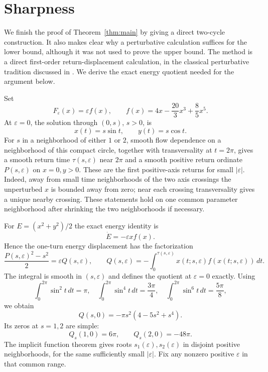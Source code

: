 \section{Sharpness}\label{sec:sharpness}

We finish the proof of Theorem~\ref{thm:main} by giving a direct
two-cycle construction. It also makes clear why a perturbative
calculation suffices for the lower bound, although it was not
used to prove the upper bound. The method is a direct first-order
return-displacement calculation, in the classical perturbative
tradition discussed in \cite{LMP,LlibreZhang}. We derive the exact
energy quotient needed for the argument below.

Set
\begin{equation}\label{eq:sharp-polynomial}
 F_\varepsilon(x)=\varepsilon f(x),\qquad
 f(x)=4x-\frac{20}{3}x^3+\frac85x^5.
\end{equation}
At $\varepsilon=0$, the solution through $(0,s)$, $s>0$, is
\[
 x(t)=s\sin t,\qquad y(t)=s\cos t.
\]
For $s$ in a neighborhood of either $1$ or $2$, smooth flow
dependence on a neighborhood of this compact circle, together
with transversality at $t=2\pi$, gives a smooth return time
$\tau(s,\varepsilon)$ near $2\pi$ and a smooth positive return
ordinate $P(s,\varepsilon)$ on $x=0,y>0$. These are the first
positive-axis returns for small $|\varepsilon|$. Indeed, away
from small time neighborhoods of the two axis crossings the
unperturbed $x$ is bounded away from zero; near each crossing
transversality gives a unique nearby crossing. These statements
hold on one common parameter neighborhood after shrinking the
two neighborhoods if necessary.

For $E=(x^2+y^2)/2$ the exact energy identity is
\[
 \dot E=-\varepsilon x f(x).
\]
Hence the one-turn energy displacement has the factorization
\begin{equation}\label{eq:energy-quotient}
 \frac{P(s,\varepsilon)^2-s^2}{2}
 =\varepsilon Q(s,\varepsilon),\qquad
 Q(s,\varepsilon)=
 -\int_0^{\tau(s,\varepsilon)}
 x(t;s,\varepsilon)f(x(t;s,\varepsilon))\,dt.
\end{equation}
The integral is smooth in $(s,\varepsilon)$ and defines the
quotient at $\varepsilon=0$ exactly. Using
\[
 \int_0^{2\pi}\sin^2t\,dt=\pi,\quad
 \int_0^{2\pi}\sin^4t\,dt=\frac{3\pi}{4},\quad
 \int_0^{2\pi}\sin^6t\,dt=\frac{5\pi}{8},
\]
we obtain
\begin{equation}\label{eq:sharp-averaged}
 Q(s,0)=-\pi s^2(4-5s^2+s^4).
\end{equation}
Its zeros at $s=1,2$ are simple:
\[
 Q_s(1,0)=6\pi,\qquad Q_s(2,0)=-48\pi.
\]
The implicit function theorem gives roots
$s_1(\varepsilon),s_2(\varepsilon)$ in disjoint positive
neighborhoods, for the same sufficiently small
$|\varepsilon|$. Fix any nonzero positive $\varepsilon$ in
that common range.

